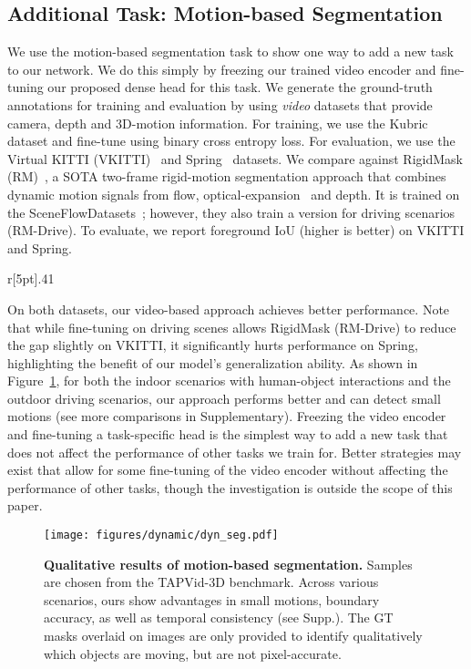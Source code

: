 \subsection{Additional Task: Motion-based Segmentation}
We use the motion-based segmentation task to show one way to add a new task to our network.
We do this simply by freezing our trained video encoder and fine-tuning our proposed dense head for this task.
We generate the ground-truth annotations for training and evaluation by using \emph{video} datasets that provide camera, depth and 3D-motion information.
For training, we use the Kubric~\cite{greff2022kubric} dataset and fine-tune using binary cross entropy loss.
For evaluation, we use the Virtual KITTI (VKITTI)~\cite{cabon2020vkitti2} and Spring~\cite{mehl2023spring} datasets.
We compare against RigidMask (RM)~\cite{yang2021rigidmotion}, a SOTA two-frame rigid-motion segmentation approach that combines dynamic motion signals from flow, optical-expansion~\cite{yang2020upgrading} and depth.
It is trained on the SceneFlowDatasets~\cite{mayer2016scenflow}; however, they also train a version for driving scenarios (RM-Drive).
To evaluate, we report foreground IoU (higher is better) on VKITTI and Spring.
\setlength{\columnsep}{2pt}
\setlength{\intextsep}{0pt}
\begin{wrapfigure}[3]{r}[5pt]{.41\columnwidth}
\end{wrapfigure}
On both datasets, our video-based approach achieves better performance.
Note that while fine-tuning on driving scenes allows RigidMask (RM-Drive) to reduce the gap slightly on VKITTI, it significantly hurts performance on Spring, highlighting the benefit of our model's generalization ability.
As shown in Figure~\ref{fig:dyn}, for both the indoor scenarios with human-object interactions and the outdoor driving scenarios, our approach performs better and can detect small motions (see more comparisons in Supplementary).
Freezing the video encoder and fine-tuning a task-specific head is the simplest way to add a new task that does not affect the performance of other tasks we train for.
Better strategies may exist that allow for some fine-tuning of the video encoder without affecting the performance of other tasks, though the investigation is outside the scope of this paper.

\begin{figure}
  \centering
  \texttt{[image: figures/dynamic/dyn\_seg.pdf]}
  \caption{\textbf{Qualitative results of motion-based segmentation.} 
  Samples are chosen from the TAPVid-3D benchmark.
  Across various scenarios, ours show advantages in small motions, boundary accuracy, as well as temporal consistency (see Supp.).
  The GT masks overlaid on images are only provided to identify qualitatively which objects are moving, but are not pixel-accurate.
  }\label{fig:dyn}
\end{figure}